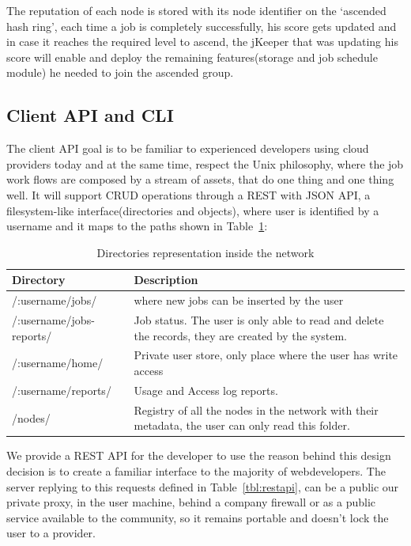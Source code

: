 The reputation of each node is stored with its node identifier on the `ascended hash ring', each time a job is completely successfully, his score gets updated and in case it reaches the required level to ascend, the jKeeper that was updating his score will enable and deploy the remaining features(storage and job schedule module) he needed to join the ascended group. 

\subsection{Client API and CLI}

The client API goal is to be familiar to experienced developers using cloud providers today and at the same time, respect the Unix philosophy, where the job work flows are composed by a stream of assets, that do one thing and one thing well. It will support CRUD operations through a REST with JSON API, a filesystem-like interface(directories and objects), where user is identified by a username and it maps to the paths shown in Table~\ref{tbl:dirrepnet}: 

\begin{table}
  \begin{tabular}{ p{3cm} | p{9cm} }
  Directory & Description \\
  \hline 
  /:username/jobs/ & where new jobs can be inserted by the user \\
  \hline
  /:username/jobs-reports/ & Job status. The user is only able to read and delete the records, they are created by the system. \\
  \hline 
  /:username/home/ &  Private user store, only place where the user has write access \\
  \hline   
  /:username/reports/ & Usage and Access log reports. \\ 
  \hline   
  /nodes/ & Registry of all the nodes in the network with their metadata, the user can only read this folder. \\
  \end{tabular}
  \caption{Directories representation inside the network}
  \label{tbl:dirrepnet}
\end{table}

We provide a REST API for the developer to use the reason behind this design decision is to create a familiar interface to the majority of webdevelopers. The server replying to this requests defined in Table~\ref{tbl:restapi}, can be a public our private proxy, in the user machine, behind a company firewall or as a public service available to the community, so it remains portable and doesn't lock the user to a provider.

